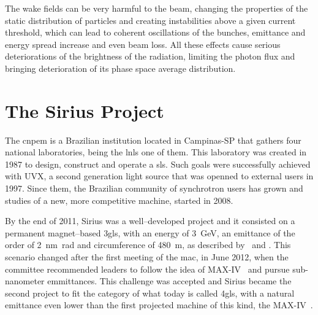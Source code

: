     The wake fields can be very harmful to the beam, changing the properties of the static distribution of particles and creating instabilities above a given current threshold, which can lead to coherent oscillations of the bunches, emittance and energy spread increase and even beam loss. All these effects cause serious deteriorations of the brightness of the radiation, limiting the photon flux and bringing deterioration of its phase space average distribution.

\section{The Sirius Project}

  	The \gls{cnpem} is a Brazilian institution located in Campinas-SP that gathers four national laboratories, being the \gls{lnls} one of them. This laboratory was created in 1987 to design, construct and operate a \gls{sls}. Such goals were successfully achieved with UVX, a second generation light source that was openned to external users in 1997. Since them, the Brazilian community of synchrotron users has grown and studies of a new, more competitive machine, started in 2008.

    By the end of 2011, Sirius was a well--developed project and it consisted on a permanent magnet--based \gls{3gls}, with an energy of \SI{3}{\giga\electronvolt}, an emittance of the order of \SI{2}{\nano\meter\radian} and circumference of \SI{480}{\meter}, as described by~ and . This scenario changed after the first meeting of the \gls{mac}, in June 2012, when the committee recommended leaders to follow the idea of MAX-IV~\cite{Leemann2009} and pursue sub-nanometer emmittances. This challenge was accepted and Sirius became the second project to fit the category of what today is called \gls{4gls}, with a natural emittance even lower than the first projected machine of this kind, the MAX-IV~\cite{Liu2013}.

